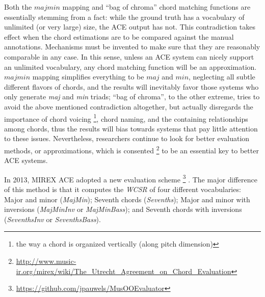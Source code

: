 Both the $majmin$ mapping and ``bag of chroma'' chord matching functions are essentially stemming from a fact: while the ground truth has a vocabulary of unlimited (or very large) size, the ACE output has not. This contradiction takes effect when the chord estimations are to be compared against the manual annotations. Mechanisms must be invented to make sure that they are reasonably comparable in any case. In this sense, unless an ACE system can nicely support an unlimited vocabulary, any chord matching function will be an approximation. $majmin$ mapping simplifies everything to be $maj$ and $min$, neglecting all subtle different flavors of chords, and the results will inevitably favor those systems who only generate \textit{maj} and \textit{min} triads; ``bag of chroma'', to the other extreme, tries to avoid the above mentioned contradiction altogether, but actually disregards the importance of chord voicing \footnote{the way a chord is organized vertically (along pitch dimension)}, chord naming, and the containing relationships among chords, thus the results will bias towards systems that pay little attention to these issues. Nevertheless, researchers continue to look for better evaluation methods, or approximations, which is consented \footnote{\url{http://www.music-ir.org/mirex/wiki/The\_Utrecht\_Agreement\_on\_Chord\_Evaluation}} to be an essential key to better ACE systems.

In 2013, MIREX ACE adopted a new evaluation scheme \footnote{\url{https://github.com/jpauwels/MusOOEvaluator}} \cite{pauwels2013evaluating}. The major difference of this method is that it computes the \textit{WCSR} of four different vocabularies: Major and minor ({\it MajMin}); Seventh chords ({\it Sevenths}); Major and minor with inversions ({\it MajMinInv} or {\it MajMinBass}); and Seventh chords with inversions ({\it SeventhsInv} or {\it SeventhsBass}).

